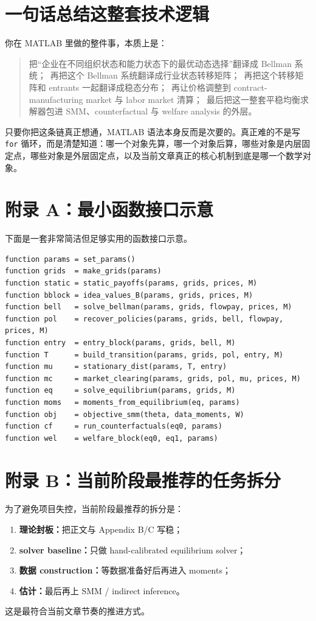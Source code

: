 \documentclass[12pt]{ctexart}
\begin{document}
\section{一句话总结这整套技术逻辑}

你在 MATLAB 里做的整件事，本质上是：
\begin{quote}
把“企业在不同组织状态和能力状态下的最优动态选择”翻译成 Bellman 系统；\
再把这个 Bellman 系统翻译成行业状态转移矩阵；\
再把这个转移矩阵和 entrants 一起翻译成稳态分布；\
再让价格调整到 contract-manufacturing market 与 labor market 清算；\
最后把这一整套平稳均衡求解器包进 SMM、counterfactual 与 welfare analysis 的外层。\
\end{quote}

只要你把这条链真正想通，MATLAB 语法本身反而是次要的。真正难的不是写 \texttt{for} 循环，而是清楚知道：哪一个对象先算，哪一个对象后算，哪些对象是内层固定点，哪些对象是外层固定点，以及当前文章真正的核心机制到底是哪一个数学对象。

\appendix

\section{附录 A：最小函数接口示意}

下面是一套非常简洁但足够实用的函数接口示意。

\begin{verbatim}
function params = set_params()
function grids  = make_grids(params)
function static = static_payoffs(params, grids, prices, M)
function bblock = idea_values_B(params, grids, prices, M)
function bell   = solve_bellman(params, grids, flowpay, prices, M)
function pol    = recover_policies(params, grids, bell, flowpay, prices, M)
function entry  = entry_block(params, grids, bell, M)
function T      = build_transition(params, grids, pol, entry, M)
function mu     = stationary_dist(params, T, entry)
function mc     = market_clearing(params, grids, pol, mu, prices, M)
function eq     = solve_equilibrium(params, grids, M)
function moms   = moments_from_equilibrium(eq, params)
function obj    = objective_smm(theta, data_moments, W)
function cf     = run_counterfactuals(eq0, params)
function wel    = welfare_block(eq0, eq1, params)
\end{verbatim}

\section{附录 B：当前阶段最推荐的任务拆分}

为了避免项目失控，当前阶段最推荐的拆分是：
\begin{enumerate}
    \item \textbf{理论封板：}把正文与 Appendix B/C 写稳；
    \item \textbf{solver baseline：}只做 hand-calibrated equilibrium solver；
    \item \textbf{数据 construction：}等数据准备好后再进入 moments；
    \item \textbf{估计：}最后再上 SMM / indirect inference。
\end{enumerate}

这是最符合当前文章节奏的推进方式。
\end{document}
